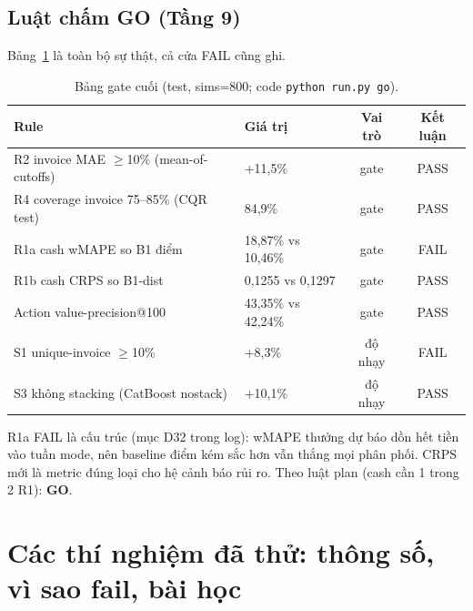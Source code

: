 \documentclass[12pt,a4paper]{article}
\begin{document}
\subsection{Luật chấm GO (Tầng 9)}
Bảng~\ref{tab:gate} là toàn bộ sự thật, cả cửa FAIL cũng ghi.

\begin{table}[h]\centering
\caption{Bảng gate cuối (test, sims=800; code \texttt{python run.py go}).}
\label{tab:gate}
\begin{tabular}{llcc}\toprule
Rule & Giá trị & Vai trò & Kết luận \\\midrule
R2 invoice MAE $\ge$10\% (mean-of-cutoffs) & +11,5\% & gate & PASS \\
R4 coverage invoice 75--85\% (CQR test) & 84,9\% & gate & PASS \\
R1a cash wMAPE so B1 điểm & 18,87\% vs 10,46\% & gate & FAIL \\
R1b cash CRPS so B1-dist & 0,1255 vs 0,1297 & gate & PASS \\
Action value-precision@100 & 43,35\% vs 42,24\% & gate & PASS \\
S1 unique-invoice $\ge$10\% & +8,3\% & độ nhạy & FAIL \\
S3 không stacking (CatBoost nostack) & +10,1\% & độ nhạy & PASS \\\bottomrule
\end{tabular}
\end{table}

R1a FAIL là cấu trúc (mục D32 trong log): wMAPE thưởng dự báo dồn hết tiền vào tuần mode,
nên baseline điểm kém sắc hơn vẫn thắng mọi phân phối. CRPS mới là metric đúng loại cho hệ
cảnh báo rủi ro. Theo luật plan (cash cần 1 trong 2 R1): \textbf{GO}.

\section{Các thí nghiệm đã thử: thông số, vì sao fail, bài học}
\label{sec:exp}
\end{document}
